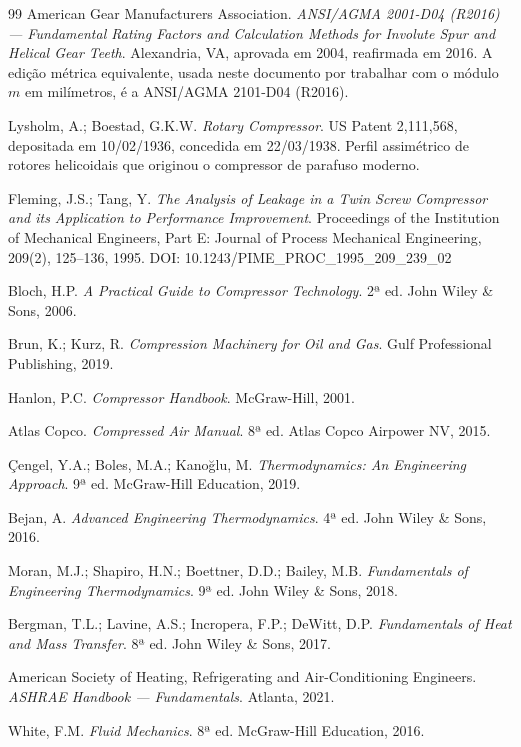 \documentclass[12pt,a4paper]{article}
\numberwithin{equation}{section}
\numberwithin{table}{section}
\numberwithin{figure}{section}
\begin{document}
{\begin{thebibliography}{99}
 American Gear Manufacturers Association. \textit{ANSI/AGMA 2001-D04 (R2016) — Fundamental Rating Factors and Calculation Methods for Involute Spur and Helical Gear Teeth}. Alexandria, VA, aprovada em 2004, reafirmada em 2016. A edição métrica equivalente, usada neste documento por trabalhar com o módulo $m$ em milímetros, é a ANSI/AGMA 2101-D04 (R2016).

 Lysholm, A.; Boestad, G.K.W. \textit{Rotary Compressor}. US Patent 2,111,568, depositada em 10/02/1936, concedida em 22/03/1938. Perfil assimétrico de rotores helicoidais que originou o compressor de parafuso moderno.

 Fleming, J.S.; Tang, Y. \textit{The Analysis of Leakage in a Twin Screw Compressor and its Application to Performance Improvement}. Proceedings of the Institution of Mechanical Engineers, Part E: Journal of Process Mechanical Engineering, 209(2), 125–136, 1995. DOI: 10.1243/PIME\_PROC\_1995\_209\_239\_02

 Bloch, H.P. \textit{A Practical Guide to Compressor Technology}. 2ª ed. John Wiley \& Sons, 2006.

 Brun, K.; Kurz, R. \textit{Compression Machinery for Oil and Gas}. Gulf Professional Publishing, 2019.

 Hanlon, P.C. \textit{Compressor Handbook}. McGraw-Hill, 2001.

 Atlas Copco. \textit{Compressed Air Manual}. 8ª ed. Atlas Copco Airpower NV, 2015.

 Çengel, Y.A.; Boles, M.A.; Kano\u{g}lu, M. \textit{Thermodynamics: An Engineering Approach}. 9ª ed. McGraw-Hill Education, 2019.

 Bejan, A. \textit{Advanced Engineering Thermodynamics}. 4ª ed. John Wiley \& Sons, 2016.

 Moran, M.J.; Shapiro, H.N.; Boettner, D.D.; Bailey, M.B. \textit{Fundamentals of Engineering Thermodynamics}. 9ª ed. John Wiley \& Sons, 2018.

 Bergman, T.L.; Lavine, A.S.; Incropera, F.P.; DeWitt, D.P. \textit{Fundamentals of Heat and Mass Transfer}. 8ª ed. John Wiley \& Sons, 2017.

 American Society of Heating, Refrigerating and Air-Conditioning Engineers. \textit{ASHRAE Handbook — Fundamentals}. Atlanta, 2021.

 White, F.M. \textit{Fluid Mechanics}. 8ª ed. McGraw-Hill Education, 2016.


\end{thebibliography}}
\end{document}

